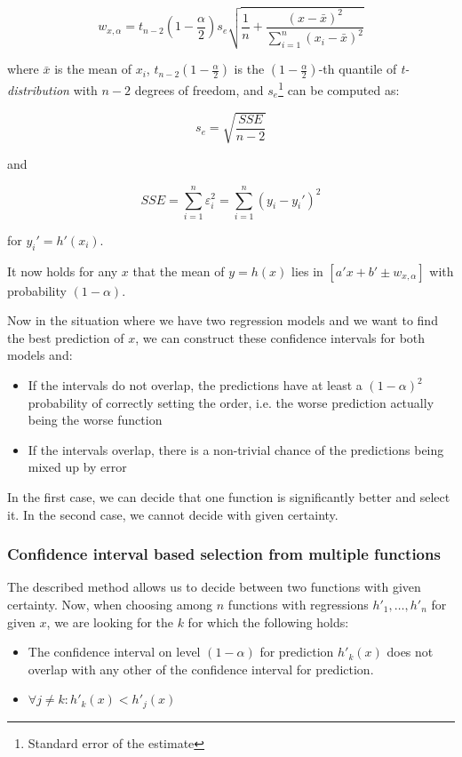 
\[
w_{x, \alpha} = t_{n - 2}(1-\frac{\alpha}{2}) s_e\sqrt{\frac{1}{n} + \frac{(x - \bar{x})^2}{ \sum_{i = 1}^{n} (x_i - \bar{x})^2 }}
\]

where \(\bar{x}\) is the mean of \(x_i\), $t_{n - 2}(1-\frac{\alpha}{2})$ is the $(1-\frac{\alpha}{2})$-th quantile of \textit{t-distribution} with $n-2$ degrees of freedom, and $s_e$\footnote{Standard error of the estimate} can be computed as:

\[s_e = \sqrt{\frac{SSE}{n-2}}\]

and

\[SSE = \sum_{i = 1}^{n} \varepsilon_i^2  =  \sum_{i = 1}^{n} (y_i - y_i')^2 \]

for \(y_i' = h'(x_i)\).

It now holds for any $x$ that the mean of $y = h(x)$ lies in $[a'x + b' \pm w_{x, \alpha}]$ with probability $(1-\alpha)$.

Now in the situation where we have two regression models and we want to find the best prediction of $x$, we can construct these confidence intervals for both models and:

\begin{itemize}
	\item If the intervals do not overlap, the predictions have at least a $(1 - \alpha)^2$ probability of correctly setting the order, i.e. the worse prediction actually being the worse function
	\item If the intervals overlap, there is a non-trivial chance of the predictions being mixed up by error
\end{itemize}

In the first case, we can decide that one function is significantly better and select it. In the second case, we cannot decide with given certainty.

\subsubsection{Confidence interval based selection from multiple functions}

The described method allows us to decide between two functions with given certainty. Now, when choosing among $n$ functions with regressions $h'_1, \dots, h'_n$ for given $x$, we are looking for the $k$ for which the following holds:

\begin{itemize}
	\item The confidence interval on level $(1-\alpha)$ for prediction $h'_k(x)$ does not overlap with any other of the confidence interval for prediction.
	\item $\forall j \ne k: h'_k(x) < h'_j(x)$
\end{itemize}

